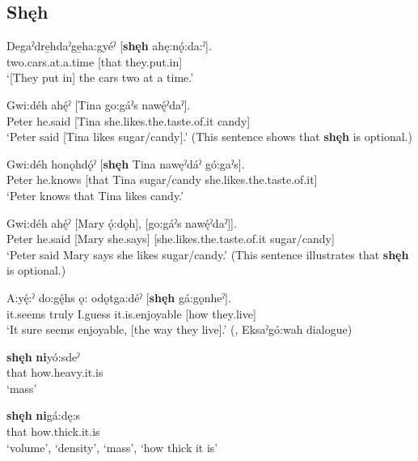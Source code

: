 \subsection*{\textbf{Shęh} } \label{p:[shęh] `that’}

\ea
\label{ex:spart11}
\gll Degaˀdre̱hdaˀge̱ha:gyéˀ [\textbf{shęh} ahę:nǫ́:da:ˀ].\\
two.cars.at.a.time [that they.put.in]\\
\glt ‘[They put in] the cars two at a time.’
\z

\ea
\label{ex:spart12}
\gll Gwi:déh ahę́ˀ [Tina go:gáˀs nawę́ˀdaˀ].\\
Peter he.said [Tina she.likes.the.taste.of.it candy]\\
\glt ‘Peter said [Tina likes sugar/candy].’ (This sentence shows that \textbf{shęh} is optional.)
\z

\ea
\label{ex:spart13}
\gll Gwi:déh honǫhdǫ́ˀ [\textbf{shęh} Tina nawęˀdáˀ gó:gaˀs].\\
Peter he.knows [that Tina sugar/candy she.likes.the.taste.of.it]\\
\glt ‘Peter knows that Tina likes candy.’
\z

\ea
\label{ex:spart14}
\gll Gwi:déh ahę́ˀ [Mary ǫ́:dǫh], [go:gáˀs nawę́ˀdaˀ]].\\
Peter he.said [Mary she.says] [she.likes.the.taste.of.it sugar/candy]\\
\glt ‘Peter said Mary says she likes sugar/candy.’ (This sentence illustrates that \textbf{shęh} is optional.)
\z

\ea
\label{ex:spart15}
\gll A:yę́:ˀ do:gę́hs ǫ: odǫtga:déˀ [\textbf{shęh} gá:gǫnheˀ].\\
it.seems truly I.guess it.is.enjoyable [how they.live]\\
\glt ‘It sure seems enjoyable, [the way they live].’ (\cite[88]{mithun_watewayestanih_1984}, Eksaˀgó:wah dialogue)
\z

\ea
\label{ex:spart16}
\gll \textbf{shęh} \textbf{ni}yó:sdeˀ\\
that how.heavy.it.is\\
\glt ‘mass’
\z

\ea
\label{ex:spart17}
\gll \textbf{shęh} \textbf{ni}gá:dę:s\\
that how.thick.it.is\\
\glt ‘volume’, `density’, `mass’, `how thick it is’
\z

